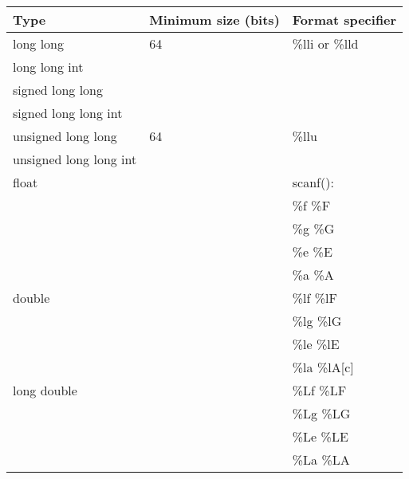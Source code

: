 \begin{frame}[fragile]
\begin{columns}
\begin{column}{0.45\textwidth}
{\tiny
\begin{center}
\begin{tabular}{|l|l|l|} \hline
Type & Minimum size (bits) & Format specifier \\ \hline
%
long long & 64 & \%lli or \%lld \\
long long int &  &  \\
signed long long &  &  \\
signed long long int &  &  \\ \hline
%
unsigned long long & 64 & \%llu \\
unsigned long long int &  &  \\ \hline
%
float &  & scanf(): \\
 &  & \%f \%F \\
 &  & \%g \%G \\
 &  & \%e \%E \\
 &  & \%a \%A \\ \hline
%
double &  & \%lf \%lF \\
 &  & \%lg \%lG \\
 &  & \%le \%lE \\
 &  & \%la \%lA[c] \\ \hline
%
long double & & \%Lf \%LF \\
 &  & \%Lg \%LG \\
 &  & \%Le \%LE \\
 &  & \%La \%LA \\ \hline
\end{tabular}
\end{center}
}
\end{column}

\end{columns}
\end{frame}


